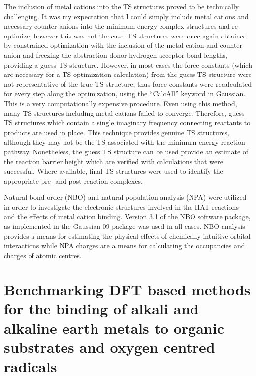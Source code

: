 The inclusion of metal cations into the TS structures proved to be technically
challenging. It was my expectation that I could simply include metal cations
and necessary counter-anions into the minimum energy complex structures and
re-optimize, however this was not the case. TS structures were once again
obtained by constrained optimization with the inclusion of the metal cation and
counter-anion and freezing the abstraction donor-hydrogen-acceptor bond
lengths, providing a guess TS structure. However, in most cases the force
constants (which are necessary for a TS optimization calculation) from the
guess TS structure were not representative of the true TS structure, thus force
constants were recalculated for every step along the optimization, using the
``CalcAll'' keyword in Gaussian. This is a very computationally expensive
procedure. Even using this method, many TS structures including metal cations
failed to converge. Therefore, guess TS structures which contain a single
imaginary frequency connecting reactants to products are used in place. This
technique provides genuine TS structures, although they may not be the TS
associated with the minimum energy reaction pathway. Nonetheless, the guess TS
structure can be used provide an estimate of the reaction barrier height which
are verified with calculations that were successful. Where available, final TS
structures were used to identify the appropriate pre- and post-reaction
complexes.

Natural bond order (NBO) and natural population analysis (NPA) were utilized in
order to investigate the electronic structures involved in the HAT reactions
and the effects of metal cation binding.\cite{Reed1983, Reed1985,
Glendening2012} Version 3.1 of the NBO software package,\cite{NBO3} as
implemented in the Gaussian 09 package was used in all cases.\cite{Frisch2009}
NBO analysis provides a means for estimating the physical effects of chemically
intuitive orbital interactions while NPA charges are a means for calculating
the occupancies and charges of atomic centres.\cite{Landis2014, Weinhold2016}

\section{Benchmarking DFT based methods for the binding of alkali and alkaline
earth metals to organic substrates and oxygen centred radicals}
\label{sec:benchmark}

